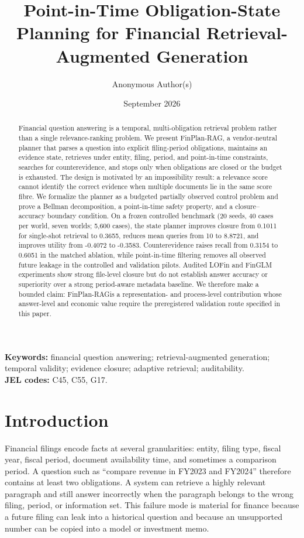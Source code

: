 \documentclass[12pt]{article}
\title{Point-in-Time Obligation-State Planning for Financial Retrieval-Augmented Generation}
\author{Anonymous Author(s)}
\date{September 2026}
\newcommand{\finplan}{FinPlan\mbox{-}RAG}
\begin{document}
\maketitle

\begin{abstract}
Financial question answering is a temporal, multi-obligation retrieval problem rather than a single relevance-ranking problem. We present \finplan, a vendor-neutral planner that parses a question into explicit filing-period obligations, maintains an evidence state, retrieves under entity, filing, period, and point-in-time constraints, searches for counterevidence, and stops only when obligations are closed or the budget is exhausted. The design is motivated by an impossibility result: a relevance score cannot identify the correct evidence when multiple documents lie in the same score fibre. We formalize the planner as a budgeted partially observed control problem and prove a Bellman decomposition, a point-in-time safety property, and a closure--accuracy boundary condition. On a frozen controlled benchmark (20 seeds, 40 cases per world, seven worlds; 5,600 cases), the state planner improves closure from 0.1011 for single-shot retrieval to 0.3655, reduces mean queries from 10 to 8.8721, and improves utility from -0.4072 to -0.3583. Counterevidence raises recall from 0.3154 to 0.6051 in the matched ablation, while point-in-time filtering removes all observed future leakage in the controlled and validation pilots. Audited LOFin and FinGLM experiments show strong file-level closure but do not establish answer accuracy or superiority over a strong period-aware metadata baseline. We therefore make a bounded claim: \finplan is a representation- and process-level contribution whose answer-level and economic value require the preregistered validation route specified in this paper.
\end{abstract}

\noindent\textbf{Keywords:} financial question answering; retrieval-augmented generation; temporal validity; evidence closure; adaptive retrieval; auditability.\\
\noindent\textbf{JEL codes:} C45, C55, G17.

\section{Introduction}
Financial filings encode facts at several granularities: entity, filing type, fiscal year, fiscal period, document availability time, and sometimes a comparison period. A question such as ``compare revenue in FY2023 and FY2024'' therefore contains at least two obligations. A system can retrieve a highly relevant paragraph and still answer incorrectly when the paragraph belongs to the wrong filing, period, or information set. This failure mode is material for finance because a future filing can leak into a historical question and because an unsupported number can be copied into a model or investment memo.
\end{document}
